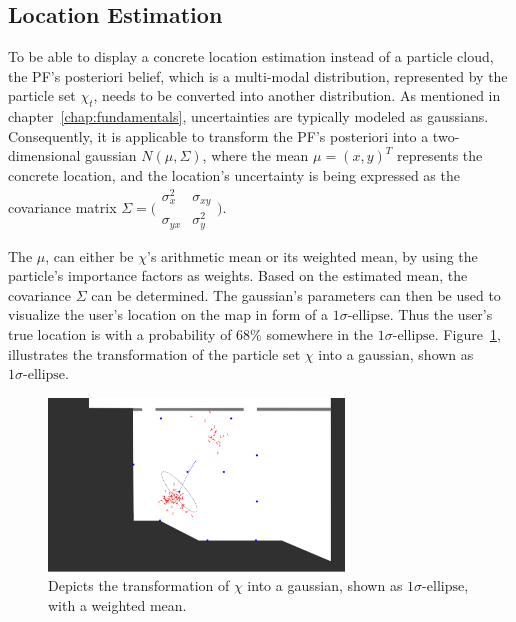 \subsection{Location Estimation}\label{sec:algo_locEstimation}
To be able to display a concrete location estimation instead of a particle cloud, the \acs{PF}'s posteriori belief, which is a multi-modal distribution, represented by the particle set $\chi_t$, needs to be converted into another distribution. As mentioned in chapter~\ref{chap:fundamentals}, uncertainties are typically modeled as gaussians. Consequently, it is applicable to transform the \acs{PF}'s posteriori into a two-dimensional gaussian $N(\mu, \Sigma)$, where the mean $\mu = (x, y)^T$ represents the concrete location, and the location's uncertainty is being expressed as the covariance matrix $\Sigma = \bigl(\begin{smallmatrix} \sigma_{x}^2&\sigma_{xy}\\ \sigma_{yx}&\sigma_{y}^2 \end{smallmatrix} \bigr)$.

The $\mu$, can either be $\chi$'s arithmetic mean or its weighted mean, by using the particle's importance factors as weights. Based on the estimated mean, the covariance $\Sigma$ can be determined. The gaussian's parameters can then be used to visualize the user's location on the map in form of a $1\sigma\text{-ellipse}$. Thus the user's true location is with a probability of $68\%$ somewhere in the $1\sigma\text{-ellipse}$. Figure~\ref{fig:algo_sigellipse}, illustrates the transformation of the particle set $\chi$ into a gaussian, shown as $1\sigma\text{-ellipse}$.

\begin{figure}
	\includegraphics[width=0.7\textwidth]{figures/sigellipse}
	\caption{Depicts the transformation of $\chi$ into a gaussian, shown as $1\sigma\text{-ellipse}$, with a weighted mean.}
	\label{fig:algo_sigellipse}
\end{figure}
